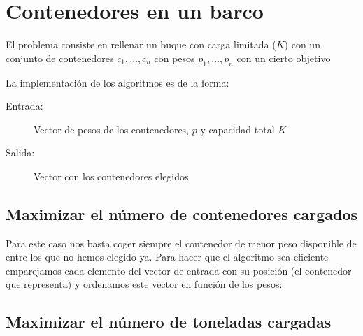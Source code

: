 
\section{Contenedores en un barco}

El problema consiste en rellenar un buque con carga limitada ($K$) con un conjunto
de contenedores $c_1,\dots, c_n$ con pesos $p_1, \dots, p_n$ con un cierto objetivo

La implementación de los algoritmos es de la forma:
\begin{description}
 \item[Entrada:] Vector de pesos de los contenedores, $p$ y capacidad total $K$
 \item[Salida:] Vector con los contenedores elegidos
\end{description}

\subsection{Maximizar el número de contenedores cargados}

Para este caso nos basta coger siempre el contenedor de menor peso disponible de entre los
que no hemos elegido ya.
Para hacer que el algoritmo sea eficiente emparejamos cada elemento
del vector de entrada con su posición (el contenedor que representa)
y ordenamos este vector en función de los pesos:

%

\subsection{Maximizar el número de toneladas cargadas}
